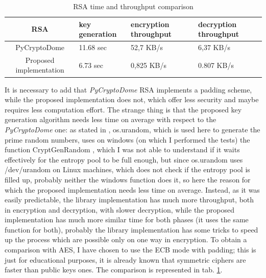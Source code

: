 \documentclass{article}
\begin{document}
\renewcommand{\arraystretch}{2}

\begin{table}[H]
	\begin{center}
		\begin{tabular}{ |c || m{2cm} | m{2cm} | m{2cm}|  }
			\hline
			RSA & key \linebreak generation & encryption \linebreak throughput & decryption \linebreak throughput \\ [0.5ex] 
			\hline\hline
			PyCryptoDome & 11.68 sec & 52,7 KB/s & 6,37 KB/s \\ 
			\hline
			Proposed implementation & 6.73 sec & 0,825 KB/s & 0.807 KB/s \\ 
			\hline
		\end{tabular}
		\caption{RSA time and throughput comparison}
		\label{tab:RSA}
	\end{center}
\end{table}

It is necessary to add that \textit{PyCryptoDome} RSA implements a padding scheme, while the proposed implementation does not, which offer less security and maybe requires less computation effort. The strange thing is that the proposed key generation algorithm needs less time on average with respect to the \textit{PyCryptoDome} one: as stated in \cite{pyrandom}, os.urandom, which is used here to generate the prime random numbers, uses on windows (on which I performed the tests) the function CryptGenRandom \cite{winRandom}, which I was not able to understand if it waits effectively for the entropy pool to be full enough, but since os.urandom uses /dev/urandom on Linux machines, which does not check if the entropy pool is filled up, probably neither the windows function does it, so here the reason for which the proposed implementation needs less time on average.\newline  
Instead, as it was easily predictable, the library implementation has much more throughput, both in encryption and decryption, with slower decryption, while the proposed implementation has much more similar time for both phases (it uses the same function for both), probably the library implementation has some tricks to speed up the process which are possible only on one way in encryption.\newline
To obtain a comparison with AES, I have chosen to use the ECB mode with padding; this is just for educational purposes, it is already known that symmetric ciphers are faster than public keys ones. The comparison is represented in tab. \ref{tab:RSA}.
\end{document}
